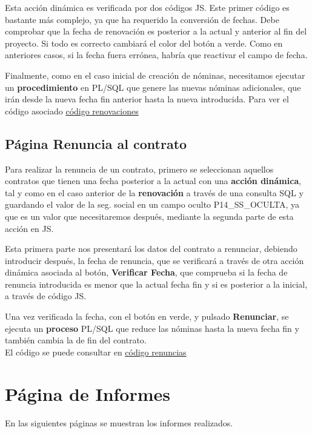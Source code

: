 Esta acción dinámica es verificada por dos códigos \acrshort{JS}.
Este primer código es bastante más complejo, ya que ha requerido la conversión de fechas. Debe comprobar que la fecha de renovación es posterior a la actual y anterior al fin del proyecto. Si todo es correcto cambiará el color del botón a verde.
Como en anteriores casos, si la fecha fuera errónea, habría que reactivar el campo de fecha.

Finalmente, como en el caso inicial de creación de nóminas, necesitamos ejecutar un \textbf{procedimiento} en \acrshort{PL/SQL} que genere las nuevas nóminas adicionales, que irán desde la nueva fecha fin anterior hasta la nueva introducida.
Para ver el código asociado \href{https://github.com/far0010/TFGUBU-Fran_Arroyo/project-docs/memoria/sql
	/consultas_renovacion.sql}{código renovaciones}

\subsection{Página Renuncia al contrato}
Para realizar la renuncia de un contrato, primero se seleccionan aquellos contratos que tienen una fecha posterior a la actual con una \textbf{acción dinámica}, tal y como en el caso anterior de la \textbf{renovación} a través de una consulta \acrshort{SQL} y guardando el valor de la seg. social en un campo oculto P14\_SS\_OCULTA, ya que es un valor que necesitaremos después, mediante la segunda parte de esta acción en \acrshort{JS}.

Esta primera parte nos presentará los datos del contrato a renunciar, debiendo introducir después, la fecha de renuncia, que se verificará a través de otra acción dinámica asociada al botón, \textbf{Verificar Fecha}, que comprueba si la fecha de renuncia introducida es menor que la actual fecha fin y si es posterior a la inicial, a través de código \acrshort{JS}.

Una vez verificada la fecha, con el botón en verde, y pulsado \textbf{Renunciar}, se ejecuta un \textbf{proceso} \acrshort{PL/SQL} que reduce las nóminas hasta la nueva fecha fin y también cambia la de fin del contrato. \\ El código se puede consultar en \href{https://github.com/far0010/TFGUBU-Fran_Arroyo/project-docs/memoria/sql
	/consultas_renuncia.sql}{código renuncias}

\section{Página de Informes}
En las siguientes páginas se muestran los informes realizados.
